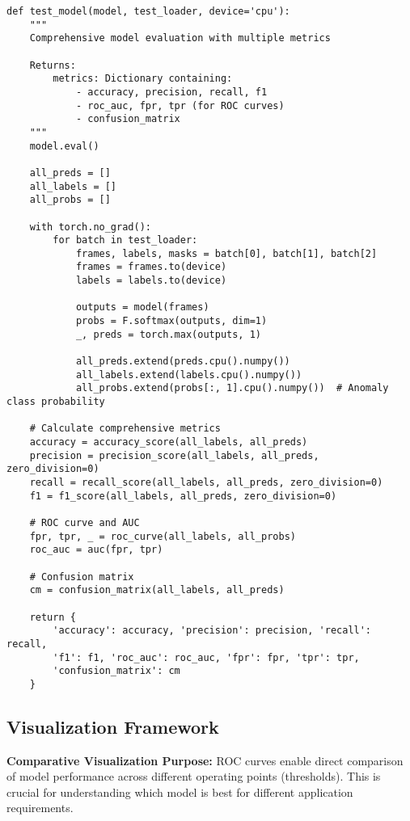 \documentclass[12pt,a4paper]{article}
\begin{document}
\begin{lstlisting}[caption={Model Evaluation - Comprehensive Performance Assessment}]
def test_model(model, test_loader, device='cpu'):
    """
    Comprehensive model evaluation with multiple metrics
    
    Returns:
        metrics: Dictionary containing:
            - accuracy, precision, recall, f1
            - roc_auc, fpr, tpr (for ROC curves)
            - confusion_matrix
    """
    model.eval()
    
    all_preds = []
    all_labels = []
    all_probs = []
    
    with torch.no_grad():
        for batch in test_loader:
            frames, labels, masks = batch[0], batch[1], batch[2]
            frames = frames.to(device)
            labels = labels.to(device)
            
            outputs = model(frames)
            probs = F.softmax(outputs, dim=1)
            _, preds = torch.max(outputs, 1)
            
            all_preds.extend(preds.cpu().numpy())
            all_labels.extend(labels.cpu().numpy())
            all_probs.extend(probs[:, 1].cpu().numpy())  # Anomaly class probability
    
    # Calculate comprehensive metrics
    accuracy = accuracy_score(all_labels, all_preds)
    precision = precision_score(all_labels, all_preds, zero_division=0)
    recall = recall_score(all_labels, all_preds, zero_division=0)
    f1 = f1_score(all_labels, all_preds, zero_division=0)
    
    # ROC curve and AUC
    fpr, tpr, _ = roc_curve(all_labels, all_probs)
    roc_auc = auc(fpr, tpr)
    
    # Confusion matrix
    cm = confusion_matrix(all_labels, all_preds)
    
    return {
        'accuracy': accuracy, 'precision': precision, 'recall': recall,
        'f1': f1, 'roc_auc': roc_auc, 'fpr': fpr, 'tpr': tpr,
        'confusion_matrix': cm
    }
\end{lstlisting}

\subsection{Visualization Framework}

\textbf{Comparative Visualization Purpose:} ROC curves enable direct comparison of model performance across different operating points (thresholds). This is crucial for understanding which model is best for different application requirements.
\end{document}

